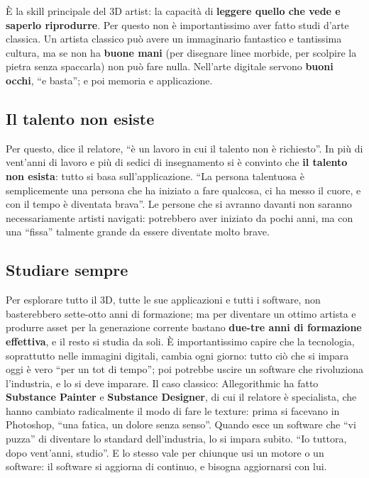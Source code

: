 È la skill principale del 3D artist: la capacità di \textbf{leggere quello che
vede e saperlo riprodurre}. Per questo non è importantissimo aver fatto studi
d'arte classica. Un artista classico può avere un immaginario fantastico e
tantissima cultura, ma se non ha \textbf{buone mani} (per disegnare linee
morbide, per scolpire la pietra senza spaccarla) non può fare nulla. Nell'arte
digitale servono \textbf{buoni occhi}, ``e basta''; e poi memoria e
applicazione.

\subsection{Il talento non esiste}

Per questo, dice il relatore, ``è un lavoro in cui il talento non è
richiesto''. In più di vent'anni di lavoro e più di sedici di insegnamento si è
convinto che \textbf{il talento non esista}: tutto si basa sull'applicazione.
``La persona talentuosa è semplicemente una persona che ha iniziato a fare
qualcosa, ci ha messo il cuore, e con il tempo è diventata brava''. Le persone
che si avranno davanti non saranno necessariamente artisti navigati: potrebbero
aver iniziato da pochi anni, ma con una ``fissa'' talmente grande da essere
diventate molto brave.

\subsection{Studiare sempre}

Per esplorare tutto il 3D, tutte le sue applicazioni e tutti i software, non
basterebbero sette-otto anni di formazione; ma per diventare un ottimo artista e
produrre asset per la generazione corrente bastano \textbf{due-tre anni di
formazione effettiva}, e il resto si studia da soli. È importantissimo capire
che la tecnologia, soprattutto nelle immagini digitali, cambia ogni giorno:
tutto ciò che si impara oggi è vero ``per un tot di tempo''; poi potrebbe uscire
un software che rivoluziona l'industria, e lo si deve imparare. Il caso
classico: Allegorithmic ha fatto \textbf{Substance Painter} e \textbf{Substance
Designer}, di cui il relatore è specialista, che hanno cambiato radicalmente il
modo di fare le texture: prima si facevano in Photoshop, ``una fatica, un
dolore senza senso''. Quando esce un software che ``vi puzza'' di diventare lo
standard dell'industria, lo si impara subito. ``Io tuttora, dopo vent'anni,
studio''. E lo stesso vale per chiunque usi un motore o un software: il software
si aggiorna di continuo, e bisogna aggiornarsi con lui.

